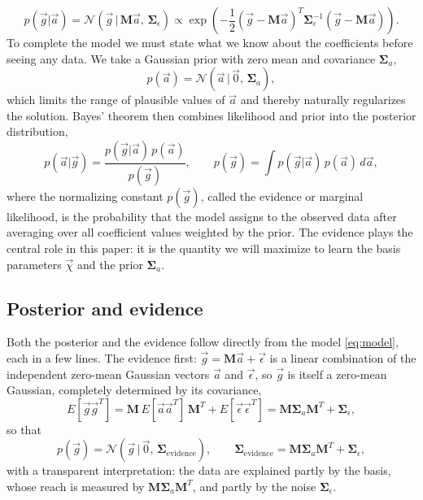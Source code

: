 \documentclass{article}
\begin{document}
\begin{equation}
    p(\vec{g}|\vec{a}) = \mathcal{N}(\vec g \,|\, \mathbf{M}\vec a,\, \mathbf{\Sigma}_\epsilon) \propto \exp\left(-\frac{1}{2}(\vec{g} - \mathbf{M}\vec{a})^T \mathbf{\Sigma}_\epsilon^{-1} (\vec{g} - \mathbf{M}\vec{a})\right). \label{eq:likelihood}
\end{equation}
To complete the model we must state what we know about the coefficients before seeing any data. We take a Gaussian prior with zero mean and covariance $\mathbf{\Sigma}_a$,
\begin{equation}
    p(\vec{a}) = \mathcal{N}(\vec a\,|\,\vec 0,\, \mathbf{\Sigma}_a), \label{eq:prior}
\end{equation}
which limits the range of plausible values of $\vec{a}$ and thereby naturally regularizes the solution. Bayes' theorem then combines likelihood and prior into the posterior distribution,
\begin{equation}
    p(\vec{a}|\vec{g}) = \frac{p(\vec{g}|\vec{a})\,p(\vec{a})}{p(\vec{g})}, \qquad
    p(\vec{g}) = \int p(\vec{g}|\vec{a})\,p(\vec{a})\,d\vec{a}, \label{eq:evidence}
\end{equation}
where the normalizing constant $p(\vec{g})$, called the evidence or marginal likelihood, is the probability that the model assigns to the observed data after averaging over all coefficient values weighted by the prior. The evidence plays the central role in this paper: it is the quantity we will maximize to learn the basis parameters $\vec\chi$ and the prior $\mathbf{\Sigma}_a$.

\subsection{Posterior and evidence}
Both the posterior and the evidence follow directly from the model \eqref{eq:model}, each in a few lines. The evidence first: $\vec g = \mathbf M\vec a + \vec\epsilon$ is a linear combination of the independent zero-mean Gaussian vectors $\vec a$ and $\vec\epsilon$, so $\vec g$ is itself a zero-mean Gaussian, completely determined by its covariance,
\begin{equation}
    E[\vec{g}\vec{g}^T] = \mathbf{M}\, E[\vec{a}\vec{a}^T]\,\mathbf{M}^T + E[\vec{\epsilon}\vec{\epsilon}^T] = \mathbf{M}\mathbf{\Sigma}_a\mathbf{M}^T + \mathbf{\Sigma}_\epsilon,
\end{equation}
so that
\begin{equation}
    p(\vec{g}) = \mathcal N(\vec g \,|\, \vec 0,\, \mathbf{\Sigma}_{\text{evidence}}), \qquad \mathbf{\Sigma}_{\text{evidence}} = \mathbf{M} \mathbf{\Sigma}_a \mathbf{M}^T + \mathbf{\Sigma}_\epsilon, \label{covariannce_evidence_woodbury}
\end{equation}
with a transparent interpretation: the data are explained partly by the basis, whose reach is measured by $\mathbf{M}\mathbf{\Sigma}_a\mathbf{M}^T$, and partly by the noise $\mathbf{\Sigma}_\epsilon$.
\end{document}
